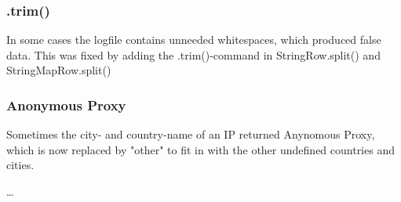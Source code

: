 \subsubsection{.trim()}
In some cases the logfile contains unneeded whitespaces, which produced false data. This was fixed by adding the .trim()-command
in StringRow.split() and StringMapRow.split()

\subsubsection{Anonymous Proxy}
Sometimes the city- and country-name of an IP returned Anynomous Proxy, which is now replaced by "other" to fit in with 
the other undefined countries and cities.


\ldots 
